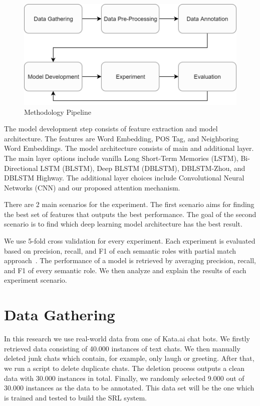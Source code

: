 \begin{figure}
	\centering
	\includegraphics[width=\linewidth]{images/pipeline}
	\caption{Methodology Pipeline}
	\label{fig:pipeline}
\end{figure}

The model development step consists of feature extraction and model architecture. The features are Word Embedding, POS Tag, and Neighboring Word Embeddings. The model architecture consists of main and additional layer. The main layer options include vanilla Long Short-Term Memories (LSTM), Bi-Directional LSTM (BLSTM), Deep BLSTM (DBLSTM), DBLSTM-Zhou, and DBLSTM Highway. The additional layer choices include Convolutional Neural Networks (CNN) and our proposed attention mechanism.

There are 2 main scenarios for the experiment. The first scenario aims for finding the best set of features that outputs the best performance. The goal of the second scenario is to find which deep learning model architecture has the best result.

We use 5-fold cross validation for every experiment. Each experiment is evaluated based on precision, recall, and F1 of each semantic roles with partial match approach~\citep{seki2003probabilistic}. The performance of a model is retrieved by averaging precision, recall, and F1 of every semantic role.  We then analyze and explain the results of each experiment scenario.

\section{Data Gathering}
In this research we use real-world data from one of Kata.ai chat bots. We firstly retrieved data consisting of 40.000 instances of text chats. We then manually deleted junk chats which contain, for example, only laugh or greeting. After that, we run a script to delete duplicate chats. The deletion process outputs a clean data with 30.000 instances in total. Finally, we randomly selected 9.000 out of 30.000 instances as the data to be annotated. This data set will be the one which is trained and tested to build the SRL system.


